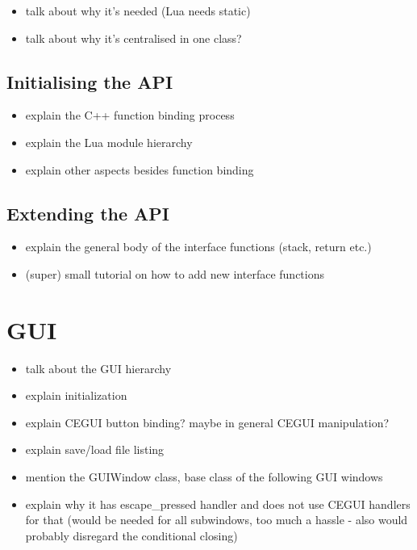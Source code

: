 \begin{itemize}
    \item talk about why it's needed (Lua needs static)
    \item talk about why it's centralised in one class?
\end{itemize}

\subsection{Initialising the API}

\begin{itemize}
    \item explain the C++ function binding process
    \item explain the Lua module hierarchy
    \item explain other aspects besides function binding
\end{itemize}

\subsection{Extending the API}

\begin{itemize}
    \item explain the general body of the interface functions (stack, return etc.)
    \item (super) small tutorial on how to add new interface functions
\end{itemize}

\section{GUI}

\begin{itemize}
    \item talk about the GUI hierarchy
    \item explain initialization
    \item explain CEGUI button binding? maybe in general CEGUI manipulation?
    \item explain save/load file listing
    \item mention the GUIWindow class, base class of the following GUI windows
    \item explain why it has escape\_pressed handler and does not use CEGUI handlers
        for that (would be needed for all subwindows, too much a hassle - also would
        probably disregard the conditional closing)
\end{itemize}

